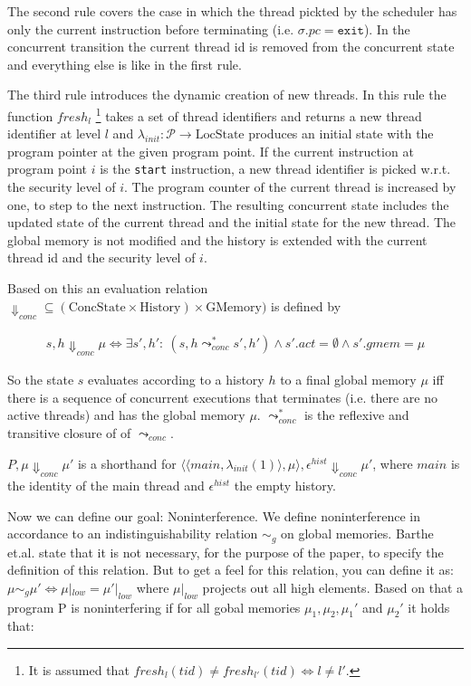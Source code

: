 \documentclass[a4paper,10pt]{llncs}
\begin{document}
The second rule covers the case in which the thread pickted by the scheduler has only the current
instruction before terminating (i.e. $\sigma.pc = \mathtt{exit}$). In the concurrent transition
the current thread id is removed from the concurrent state and everything else is like in the
first rule.

The third rule introduces the dynamic creation of new threads. In this rule the function $fresh_{l}$
\footnote{It is assumed that $fresh_l(tid) \neq fresh_{l'}(tid) \Leftrightarrow l \neq l'$.}
takes a set of thread identifiers and returns a new thread identifier at level $l$ and $\lambda_{init} : \mathcal{P}
\rightarrow \text{LocState}$ produces an initial state with the program pointer at the given program point.
If the current instruction at program point $i$ is the \texttt{start} instruction, a new thread
identifier is picked w.r.t. the security level of $i$. The program counter of the current thread
is increased by one, to step to the next instruction. The resulting concurrent state includes the
updated state of the current thread and the initial state for the new thread. The global memory
is not modified and the history is extended with the current thread id and the security level of $i$.

Based on this an evaluation relation $\Downarrow_{conc} \subseteq (\text{ConcState} \times \text{History}) \times
\text{GMemory})$ is defined by

\begin{align*}
s, h \Downarrow_{conc} \mu \Leftrightarrow \exists s', h':\ (s,h \leadsto_{conc}^* s',h') \land s'.act = \emptyset \land s'.gmem = \mu
\end{align*}

So the state $s$ evaluates according to a history $h$ to a final global memory $\mu$ iff there is a
sequence of concurrent executions that terminates (i.e. there are no active threads) and has the
global memory $\mu$. $\leadsto_{conc}^*$ is the reflexive and transitive closure of of $\leadsto_{conc}$.

$P, \mu \Downarrow_{conc} \mu'$ is a shorthand for $\langle\langle main,\lambda_{init}(1)\rangle,
\mu\rangle, \epsilon^{hist} \Downarrow_{conc} \mu'$, where $main$ is the identity of the main thread
and $\epsilon^{hist}$ the empty history.

Now we can define our goal: Noninterference. We define noninterference
in accordance to an indistinguishability relation $\sim_g$ on global memories.
Barthe et.al. state that it is not necessary, for the purpose of the paper,
to specify the definition of this relation. But to get a feel for this
relation, you can define it as: $\mu \sim_g \mu' \Leftrightarrow \mu|_{low} =
\mu'|_{low}$ where $\mu|_{low}$ projects out all high elements. Based on that
a program P is noninterfering if for all gobal memories $\mu_1, \mu_2, \mu_1'$
and $\mu_2'$ it holds that:
\end{document}
